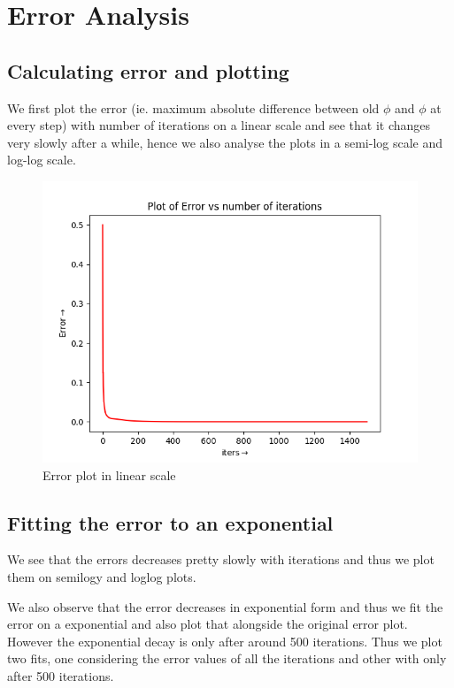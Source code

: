\documentclass{article}
\begin{document}
\section{Error Analysis}
\subsection{Calculating error and plotting}

We first plot the error (ie. maximum absolute difference between old $\phi$ and $\phi$ at every step)
with number of iterations on a linear scale and see that it changes very slowly after a while,
hence we also analyse the plots in a semi-log scale and log-log scale.

\begin{figure}[h!]
    \centering
    \includegraphics[scale=0.6]{plots/Plot of Error vs number of iterations.png}
    \caption{Error plot in linear scale}
    \label{fig2}
\end{figure}

\subsection{Fitting the error to an exponential}

We see that the errors decreases pretty slowly with iterations and thus we plot them on semilogy and loglog plots.

We also observe that the error decreases in exponential form and thus we fit the error on a exponential and also plot that alongside the original error plot. However the exponential decay is only after around 500 iterations. Thus we plot two fits, one considering the error values of all the iterations and other with only after 500 iterations.
\end{document}
